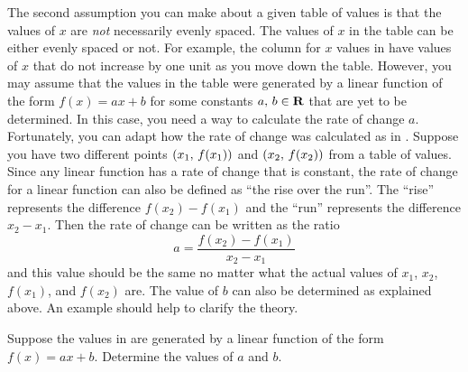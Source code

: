 \documentclass[a4paper,oneside,12pt]{article}
\begin{document}
The second assumption you can make about a given table of values is
that the values of $x$ are \emph{not} necessarily evenly spaced.  The
values of $x$ in the table can be either evenly spaced or not.  For
example, the column for $x$ values in
 have values of $x$
that do not increase by one unit as you move down the table.  However,
you may assume that the values in the table were generated by a linear
function of the form $f(x) = ax + b$ for some constants
${a},\, {b} \in \mathbf{R}$ that are yet to be determined.  In this case,
you need a way to calculate the rate of change $a$.  Fortunately, you
can adapt how the rate of change was calculated as in
.  Suppose you have two
different points $\left\lparen{x_1},\, {f(x_1)}\right\rparen$ and $\left\lparen{x_2},\, {f(x_2)}\right\rparen$ from
a table of values.  Since any linear function has a rate of change
that is constant, the rate of change for a linear function can also be
defined as ``the rise over the run''.  The ``rise'' represents the
difference $f(x_2) - f(x_1)$ and the ``run'' represents the difference
$x_2 - x_1$.  Then the rate of change can be written as the ratio
\begin{equation}
\label{eqn:linear_function_rate_of_change}
a
=
\frac{
  f(x_2) - f(x_1)
}{
  x_2 - x_1
}
\end{equation}
and this value should be the same no matter what the actual values of
$x_1$, $x_2$, $f(x_1)$, and $f(x_2)$ are.  The value of $b$ can also
be determined as explained above.  An example should help to clarify
the theory.

\begin{example}
Suppose the values in 
are generated by a linear function of the form $f(x) = ax + b$.
Determine the values of $a$ and $b$.
\end{example}
\end{document}
